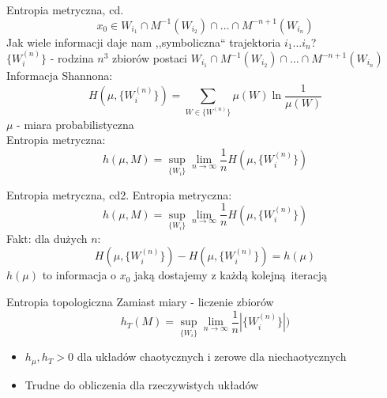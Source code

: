 \documentclass{beamer}
\begin{document}
\begin{frame}{Entropia metryczna, cd.}
	\begin{equation*}
		x_0 \in W_{i_1} \cap M^{-1}(W_{i_2}) \cap \dots \cap M^{-n+1}(W_{i_n})
	\end{equation*}
	Jak wiele informacji daje nam ,,symboliczna`` trajektoria $i_1 \dots i_n$?\\ \pause
	$\{W^{(n)}_i\}$ - rodzina $n^3$ zbiorów postaci
	$W_{i_1} \cap M^{-1}(W_{i_2}) \cap \dots \cap M^{-n+1}(W_{i_n})$ \pause \\
	Informacja Shannona:
	\begin{equation*}
		H(\mu, \{W^{(n)}_i\})=\sum_{W \in \{W^{(n)}\}}\mu(W)\ln\frac{1}{\mu(W)}
	\end{equation*}
	$\mu$ - miara probabilistyczna\\ \pause
	Entropia metryczna:
	\begin{equation*}
		h(\mu, M) = \sup_{\{W_i\}}\lim_{n\to\infty}\frac{1}{n}H(\mu, \{W_i^{(n)}\})
	\end{equation*}
\end{frame}

\begin{frame}{Entropia metryczna, cd2.}
	Entropia metryczna:
	\begin{equation*}
		h(\mu, M) = \sup_{\{W_i\}}\lim_{n\to\infty}\frac{1}{n}H(\mu, \{W_i^{(n)}\})
	\end{equation*}
	Fakt: dla dużych $n$: 
	\begin{equation*}
		H(\mu, \{W^{(n)}_i\}) - H(\mu, \{W^{(n)}_i\}) = h(\mu)
	\end{equation*}
 $h(\mu)$ to informacja o $x_0$ jaką dostajemy z każdą kolejną iteracją
\end{frame}

\begin{frame}{Entropia topologiczna}
	Zamiast miary - liczenie zbiorów
	\begin{equation*}
		h_T(M) = \sup_{\{W_i\}}\lim_{n\to\infty}\frac{1}{n}|\{W_i^{(n)}\}|)
	\end{equation*}
	\begin{itemize}
		\item $h_\mu, h_T > 0 $ dla układów chaotycznych i zerowe dla niechaotycznych
		\item Trudne do obliczenia dla rzeczywistych układów
	\end{itemize} 
\end{frame}
\end{document}
